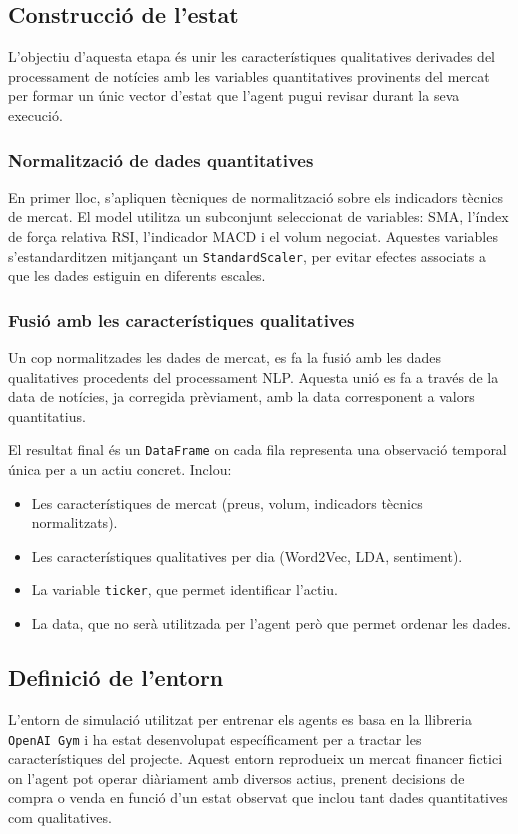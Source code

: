 \documentclass[12pt,a4paper,twoside]{book}
\begin{document}
\subsection{Construcció de l'estat}

L'objectiu d'aquesta etapa és unir les característiques qualitatives derivades del processament de notícies amb les variables quantitatives provinents del mercat per formar un únic vector d'estat que l'agent pugui revisar durant la seva execució.

\subsubsection{Normalització de dades quantitatives}
En primer lloc, s'apliquen tècniques de normalització sobre els indicadors tècnics de mercat. El model utilitza un subconjunt seleccionat de variables: SMA, l'índex de força relativa RSI, l'indicador MACD i el volum negociat. Aquestes variables s'estandarditzen mitjançant un \texttt{StandardScaler}, per evitar efectes associats a que les dades estiguin en diferents escales.

\subsubsection{Fusió amb les característiques qualitatives}

Un cop normalitzades les dades de mercat, es fa la fusió amb les dades qualitatives procedents del processament NLP. Aquesta unió es fa a través de la data de notícies, ja corregida prèviament, amb la data corresponent a valors quantitatius.


El resultat final és un \texttt{DataFrame} on cada fila representa una observació temporal única per a un actiu concret. Inclou:
\begin{itemize}
    \item Les característiques de mercat (preus, volum, indicadors tècnics normalitzats).
    \item Les característiques qualitatives per dia (Word2Vec, LDA, sentiment).
    \item La variable \texttt{ticker}, que permet identificar l'actiu.
    \item La data, que no serà utilitzada per l'agent però que permet ordenar les dades.
\end{itemize}

\subsection{Definició de l'entorn}
L'entorn de simulació utilitzat per entrenar els agents es basa en la llibreria \texttt{OpenAI Gym} i ha estat desenvolupat específicament per a tractar les característiques del projecte. Aquest entorn reprodueix un mercat financer fictici on l'agent pot operar diàriament amb diversos actius, prenent decisions de compra o venda en funció d'un estat observat que inclou tant dades quantitatives com qualitatives.
\end{document}
